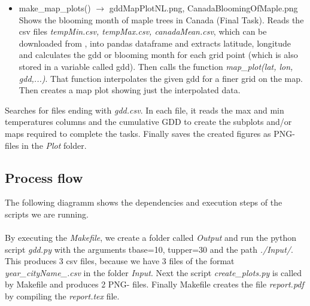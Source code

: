 \documentclass[12pt]{article}
\begin{document}
\begin{description}
\begin{itemize}
\item make\_map\_plots() $\to$ gddMapPlotNL.png, CanadaBloomingOfMaple.png \\
Shows the blooming month of maple trees in Canada (Final Task).
Reads the csv files \emph{tempMin.csv, tempMax.csv, canadaMean.csv}, which can 
be downloaded from \cite{gridTemp}, into pandas dataframe and extracts latitude, 
longitude and calculates the gdd or blooming month for each grid point 
(which is also stored in a variable called gdd).
Then calls the function \emph{map\_plot(lat, lon, gdd,...)}. That function
interpolates the given gdd for a finer grid on the map. Then creates a map plot
showing just the interpolated data.
\end{itemize} 
\item Searches for files ending with \emph{gdd.csv}. 
In each file, it reads the max and min temperatures columns and the cumulative 
GDD to create the subplots and/or maps required to complete the tasks. 
Finally saves the created figures as PNG-files in the \emph{Plot} folder.

\end{description}
\subsection{Process flow}
The following diagramm shows the dependencies and execution steps of the scripts
we are running.
\\~\\
By executing the \emph{Makefile}, we create a folder called \emph{Output} and run
the python script \emph{gdd.py} with the arguments tbase=10, tupper=30 and the path
 \emph{./Input/}. This produces 3 csv files, because we have 3 files of the 
format \emph{year\_cityName\_.csv} in the folder \emph{Input}.
Next the script \emph{create\_plots.py} is called by Makefile and produces 2 PNG-
files. Finally Makefile creates the file \emph{report.pdf} by compiling the 
\emph{report.tex} file.
\end{document}
